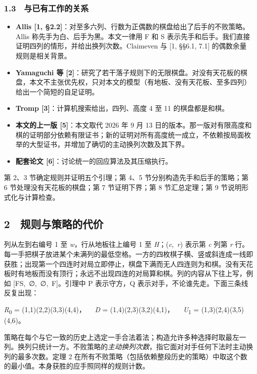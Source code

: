 \documentclass[
  a4paper,
]{article}
\providecommand{\tightlist}{%
  \setlength{\itemsep}{0pt}\setlength{\parskip}{0pt}}
\begin{document}
\subsubsection{1.3 与已有工作的关系}\label{ux4e0eux5df2ux6709ux5de5ux4f5cux7684ux5173ux7cfb}

\begin{itemize}
\tightlist
\item
  \textbf{Allis {[}1,
  §2.2{]}}：对至多六列、行数为正偶数的棋盘给出了后手的不败策略。Allis
  称先手为白、后手为黑。本文一律用 F 和 S
  表示先手和后手。我们直接证明四列的情形，并给出换列次数。Claimeven 与
  {[}1, §§6.1, 7.1{]} 的偶数余量规则是相关背景。
\item
  \textbf{Yamaguchi 等
  {[}2{]}}：研究了若干落子规则下的无限棋盘。对没有天花板的棋盘，本文不主张优先权，只对本文的模型（有地板、没有天花板、至多四列）给出一个简短的自足证明。
\item
  \textbf{Tromp {[}3{]}}：计算机搜索给出，四列、高度 4 至 11
  的棋盘都是和棋。
\item
  \textbf{本文的上一版 {[}5{]}}：本文取代 2026 年 9 月 13
  日的版本。那一版对有限高度和棋的证明部分依赖有限证书；新的证明对所有高度统一成立，不依赖按局面枚举的大型证书，并增加了确切的主动换列次数及其下界。
\item
  \textbf{配套论文 {[}6{]}}：讨论统一的回应算法及其压缩执行。
\end{itemize}

第 2、3 节确定规则并证明五个引理；第 4、5 节分别构造先手和后手的策略；第
6 节处理没有天花板的棋盘；第 7 节证明下界；第 8 节汇总定理；第 9
节说明形式化与计算检查。

\subsection{2 规则与策略的代价}\label{ux89c4ux5219ux4e0eux7b56ux7565ux7684ux4ee3ux4ef7}

列从左到右编号 1 至 \emph{w}，行从地板往上编号 1 至
\emph{H}；(\emph{c},~\emph{r}) 表示第 \emph{c} 列第 \emph{r}
行。每一手把棋子放进某个未满列的最低空格。一方的四枚棋子横、竖或斜连成一线即获胜；出现第一个四连时对局立即停止，棋盘下满而无人四连则为和棋。没有天花板时有地板而没有顶行；永远不出现四连的对局算和棋。列的内容从下往上写，例如
{[}FS,~∅,~∅,~F{]}。引理中 P 表示守方，Q
表示对手，不论谁先走。下面三条线反复出现：

\emph{R}\textsubscript{0} = (1,1)(2,2)(3,3)(4,4)，~~ \emph{D} =
(1,4)(2,3)(3,2)(4,1)，~~ \emph{U}\textsubscript{1} =
(1,3)(2,4)(3,5)(4,6)。

策略在每个与它一致的历史上选定一手合法着法；构造允许多种选择时取最左一列。换列只统计一方。不败策略的\emph{主动换列次数}，指它面对对手任何下法时主动换列的最多次数。定理
2
在所有不败策略（包括依赖整段历史的策略）中取这个数的最小值。本身获胜的应手照同样的规则计数。
\end{document}
